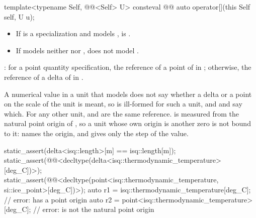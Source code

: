 \begin{itemdecl}
template<typename Self, @@<Self{}> U>
consteval @@ auto operator[](this Self self, U u);
\end{itemdecl}

\begin{itemdescr}
\pnum
\constraints
\begin{itemize}
\item
If  is a specialization  and
 models ,
 is .
\item
If  models neither  nor ,
 does not model .
\end{itemize}

\pnum
\returns
{}:
for a point quantity specification, the reference of a point of  in ;
otherwise, the reference of a delta of  in .

\pnum
\begin{note}
A numerical value in a unit that models 
does not say whether a delta or a point on the scale of the unit is meant,
so  is ill-formed for such a unit,
and  and  say which.
For any other unit,  and  are the same reference.
 is measured from the natural point origin of ,
so a unit whose own origin is another zero is not bound to it:
 names the origin, and  gives only the step of the value.
\end{note}
\begin{example}
\begin{codeblock}
static_assert(delta<isq::length>[m] == isq::length[m]);
static_assert(@@<decltype(delta<isq::thermodynamic_temperature>[deg_C])>);
static_assert(@@<decltype(point<isq::thermodynamic_temperature, si::ice_point>[deg_C])>);
auto r1 = isq::thermodynamic_temperature[deg_C];          // error:  has a point origin
auto r2 = point<isq::thermodynamic_temperature>[deg_C];   // error:  is not the natural point origin
\end{codeblock}
\end{example}
\end{itemdescr}

